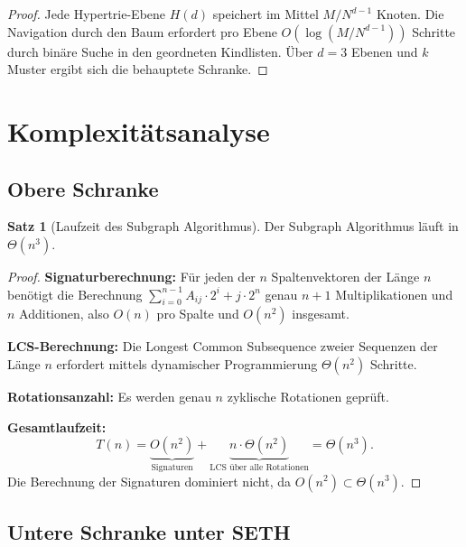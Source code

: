 ﻿\documentclass[a4paper,12pt]{article}
\theoremstyle{definition}
\newtheorem{satz}{Satz}
\begin{document}
\begin{proof}
Jede Hypertrie-Ebene $H(d)$ speichert im Mittel $M/N^{d-1}$ Knoten. Die Navigation
durch den Baum erfordert pro Ebene $O(\log(M/N^{d-1}))$ Schritte durch binäre Suche
in den geordneten Kindlisten. Über $d=3$ Ebenen und $k$ Muster ergibt sich die
behauptete Schranke.
\end{proof}

\section{Komplexitätsanalyse}
\label{sec:komplexitaet}

\subsection{Obere Schranke}

\begin{satz}[Laufzeit des Subgraph Algorithmus]
\label{satz:laufzeit}
Der Subgraph Algorithmus läuft in $\Theta(n^3)$.
\end{satz}

\begin{proof}
\textbf{Signaturberechnung:} Für jeden der $n$ Spaltenvektoren der Länge $n$ benötigt
die Berechnung $\sum_{i=0}^{n-1} A_{ij} \cdot 2^i + j \cdot 2^n$ genau $n+1$
Multiplikationen und $n$ Additionen, also $O(n)$ pro Spalte und $O(n^2)$ insgesamt.

\textbf{LCS-Berechnung:} Die Longest Common Subsequence zweier Sequenzen der Länge $n$
erfordert mittels dynamischer Programmierung $\Theta(n^2)$ Schritte.

\textbf{Rotationsanzahl:} Es werden genau $n$ zyklische Rotationen geprüft.

\textbf{Gesamtlaufzeit:}
\[
  T(n) = \underbrace{O(n^2)}_{\text{Signaturen}} +
         \underbrace{n \cdot \Theta(n^2)}_{\text{LCS über alle Rotationen}}
       = \Theta(n^3).
\]
Die Berechnung der Signaturen dominiert nicht, da $O(n^2) \subset \Theta(n^3)$.
\end{proof}

\subsection{Untere Schranke unter SETH}
\end{document}
